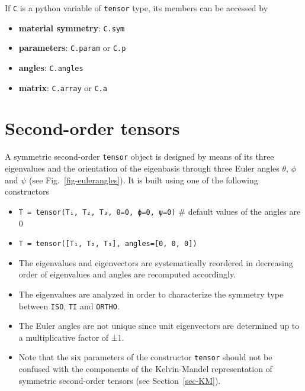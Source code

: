 \documentclass[
  a4paper,
  numbers=noendperiod,
  DIV=12]{scrreprt}
\providecommand{\tightlist}{%
  \setlength{\itemsep}{0pt}\setlength{\parskip}{0pt}}\usepackage{longtable,booktabs,array}
\begin{document}
If \texttt{C} is a python variable of \texttt{tensor} type, its members
can be accessed by

\begin{itemize}
\tightlist
\item
  \textbf{material symmetry}: \texttt{C.sym}
\item
  \textbf{parameters}: \texttt{C.param} or \texttt{C.p}
\item
  \textbf{angles}: \texttt{C.angles}
\item
  \textbf{matrix}: \texttt{C.array} or \texttt{C.a}
\end{itemize}

\section{Second-order tensors}\label{second-order-tensors}

A symmetric second-order \texttt{tensor} object is designed by means of
its three eigenvalues and the orientation of the eigenbasis through
three Euler angles \(\theta\), \(\phi\) and \(\psi\) (see
Fig.~\ref{fig-eulerangles}). It is built using one of the following
constructors

\begin{itemize}
\tightlist
\item
  \texttt{T\ =\ tensor(T₁,\ T₂,\ T₃,\ θ=0,\ ϕ=0,\ ψ=0)} \# default
  values of the angles are 0
\item
  \texttt{T\ =\ tensor({[}T₁,\ T₂,\ T₃{]},\ angles={[}0,\ 0,\ 0{]})}
\end{itemize}

\begin{tcolorbox}[enhanced jigsaw, title=\textcolor{quarto-callout-warning-color}{\faExclamationTriangle}\hspace{0.5em}{Warning}, left=2mm, titlerule=0mm, colback=white, breakable, colframe=quarto-callout-warning-color-frame, bottomtitle=1mm, toptitle=1mm, rightrule=.15mm, bottomrule=.15mm, coltitle=black, opacitybacktitle=0.6, arc=.35mm, colbacktitle=quarto-callout-warning-color!10!white, leftrule=.75mm, opacityback=0, toprule=.15mm]

\begin{itemize}
\tightlist
\item
  The eigenvalues and eigenvectors are systematically reordered in
  decreasing order of eigenvalues and angles are recomputed accordingly.
\item
  The eigenvalues are analyzed in order to characterize the symmetry
  type between \texttt{ISO}, \texttt{TI} and \texttt{ORTHO}.
\item
  The Euler angles are not unique since unit eigenvectors are determined
  up to a multiplicative factor of ±1.
\item
  Note that the six parameters of the constructor \texttt{tensor} should
  not be confused with the components of the Kelvin-Mandel
  representation of symmetric second-order tensors (see
  Section~\ref{sec-KM}).
\end{itemize}

\end{tcolorbox}
\end{document}
